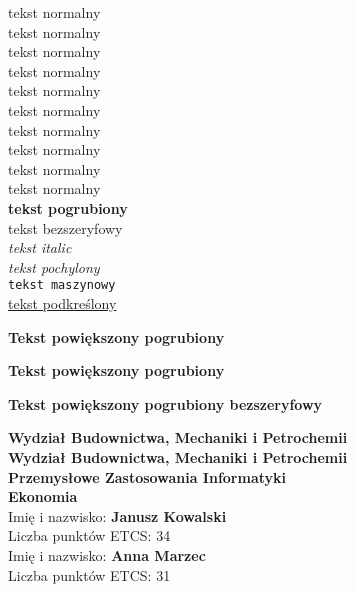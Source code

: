 \documentclass[12pt]{article}
\newcommand{\wydzial}{\textbf{Wydział Budownictwa, Mechaniki i Petrochemii}}
\newcommand{\kierunek}[1]{\textbf{\textsf{#1}}}
\newcommand{\student}[3]{%
Imię i nazwisko: \textbf{#1 #2} \\
Liczba punktów ETCS: \textsf{#3}
}
\begin{document}
{\tiny tekst normalny} \\
{\scriptsize tekst normalny} \\
{\footnotesize tekst normalny} \\
{\small tekst normalny} \\
tekst normalny \\
{\large tekst normalny} \\
{\Large tekst normalny} \\
{\LARGE tekst normalny} \\
{\huge tekst normalny} \\
{\Huge tekst normalny} \\

\noindent
\textbf{tekst pogrubiony} \\
\textsf{tekst bezszeryfowy} \\
\textit{tekst italic} \\
\textsl{tekst pochylony} \\
\texttt{tekst maszynowy} \\
\underline{tekst podkreślony} \\

\begin{center}
	{\Large \textbf{Tekst powiększony pogrubiony}}
\end{center}

\begin{center}
	\textbf{\Large {Tekst powiększony pogrubiony}}
\end{center}

\begin{center}
	{\Large \textbf{\textsf{Tekst powiększony pogrubiony bezszeryfowy}}}
\end{center}

\noindent
\wydzial \\
\wydzial \\
\kierunek{Przemysłowe Zastosowania Informatyki} \\
\kierunek{Ekonomia} \\
\student{Janusz}{Kowalski}{34} \\
\student{Anna}{Marzec}{31}
\end{document}
